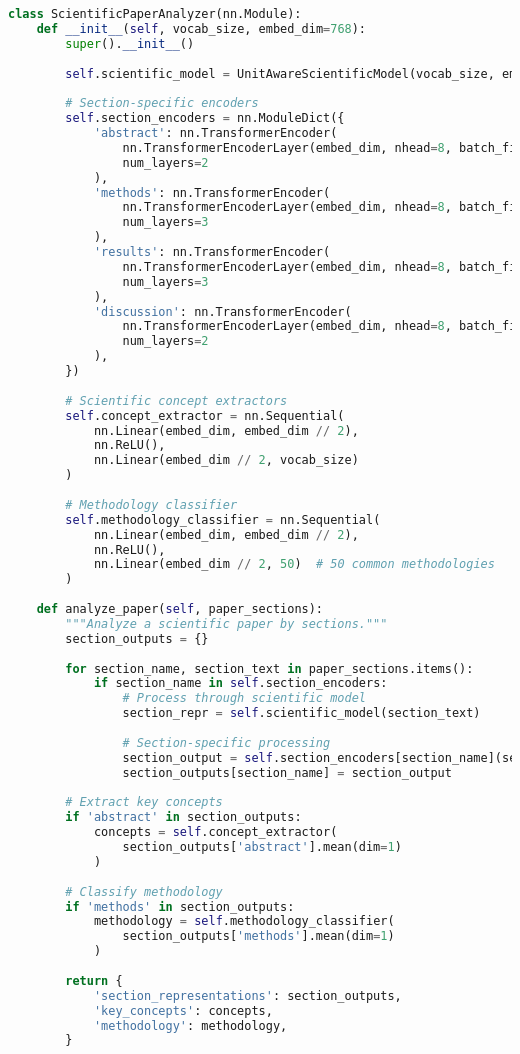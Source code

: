 \begin{lstlisting}[language=Python, caption=Scientific paper analysis with specialized tokens]
class ScientificPaperAnalyzer(nn.Module):
    def __init__(self, vocab_size, embed_dim=768):
        super().__init__()
        
        self.scientific_model = UnitAwareScientificModel(vocab_size, embed_dim)
        
        # Section-specific encoders
        self.section_encoders = nn.ModuleDict({
            'abstract': nn.TransformerEncoder(
                nn.TransformerEncoderLayer(embed_dim, nhead=8, batch_first=True),
                num_layers=2
            ),
            'methods': nn.TransformerEncoder(
                nn.TransformerEncoderLayer(embed_dim, nhead=8, batch_first=True),
                num_layers=3
            ),
            'results': nn.TransformerEncoder(
                nn.TransformerEncoderLayer(embed_dim, nhead=8, batch_first=True),
                num_layers=3
            ),
            'discussion': nn.TransformerEncoder(
                nn.TransformerEncoderLayer(embed_dim, nhead=8, batch_first=True),
                num_layers=2
            ),
        })
        
        # Scientific concept extractors
        self.concept_extractor = nn.Sequential(
            nn.Linear(embed_dim, embed_dim // 2),
            nn.ReLU(),
            nn.Linear(embed_dim // 2, vocab_size)
        )
        
        # Methodology classifier
        self.methodology_classifier = nn.Sequential(
            nn.Linear(embed_dim, embed_dim // 2),
            nn.ReLU(),
            nn.Linear(embed_dim // 2, 50)  # 50 common methodologies
        )
        
    def analyze_paper(self, paper_sections):
        """Analyze a scientific paper by sections."""
        section_outputs = {}
        
        for section_name, section_text in paper_sections.items():
            if section_name in self.section_encoders:
                # Process through scientific model
                section_repr = self.scientific_model(section_text)
                
                # Section-specific processing
                section_output = self.section_encoders[section_name](section_repr)
                section_outputs[section_name] = section_output
        
        # Extract key concepts
        if 'abstract' in section_outputs:
            concepts = self.concept_extractor(
                section_outputs['abstract'].mean(dim=1)
            )
        
        # Classify methodology
        if 'methods' in section_outputs:
            methodology = self.methodology_classifier(
                section_outputs['methods'].mean(dim=1)
            )
        
        return {
            'section_representations': section_outputs,
            'key_concepts': concepts,
            'methodology': methodology,
        }
\end{lstlisting}

